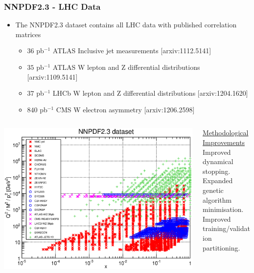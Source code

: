 \documentclass[10pt]{beamer}
\begin{document}
\begin{frame}
\frametitle{NNPDF2.3 - LHC Data}
\begin{itemize}
\item<1->{ \small The NNPDF2.3 dataset contains all LHC data with published correlation matrices }
 \begin{itemize}
 \item<1->  $36$ pb$^{-1}$ ATLAS Inclusive jet measurements \hfill  {\color{blue}[arxiv:1112.5141]}
  \item<1->  $35$ pb$^{-1}$  ATLAS W lepton and Z differential distributions \hfill{\color{blue}[arxiv:1109.5141]}
   \item<1->  $37$ pb$^{-1}$ LHCb W lepton and Z differential distributions \hfill {\color{blue}[arxiv:1204.1620]}
  \item<1-> $840$ pb$^{-1}$ CMS  W electron asymmetry \hfill {\color{blue}[arxiv:1206.2598]}

\end{itemize}
\end{itemize}

\begin{columns}
  \begin{column}{0.5\textwidth}
   \includegraphics[width=1.0\textwidth]{kin23}
  \end{column}

  \begin{column}{0.5\textwidth}
    \small
\underline{Methodological Improvements}\\
\vskip10pt
Improved dynamical stopping.\\
Expanded genetic algorithm minimisation.\\
Improved training/validation partitioning.


\end{column}
\end{columns}
\end{frame}
\end{document}
